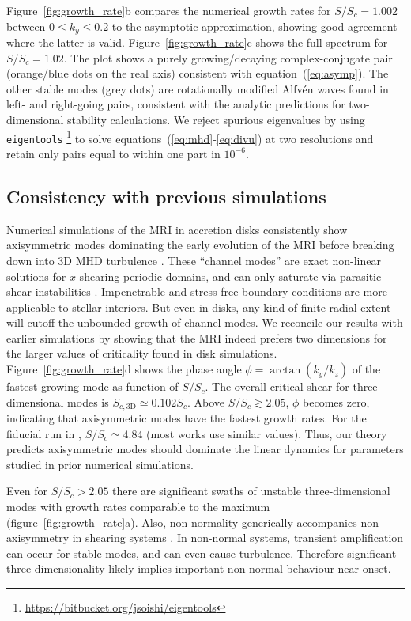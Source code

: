 \documentclass[openacc]{rsproca_new}%
\newcommand{\SSC}{S/S_{c}}
\begin{document}
Figure~\ref{fig:growth_rate}b compares the numerical growth rates for $\SSC=1.002$ between $0\le{k_{y}}\le0.2$ to the asymptotic approximation, showing good agreement where the latter is valid.
Figure~\ref{fig:growth_rate}c shows the full spectrum for $\SSC=1.02$.
The plot shows a purely growing/decaying complex-conjugate pair (orange/blue dots on the real axis) consistent with equation~(\ref{eq:asymp}).
The other stable modes (grey dots) are rotationally modified Alfv\'{e}n waves found in left- and right-going pairs, consistent with the analytic predictions for two-dimensional stability calculations.
We reject spurious eigenvalues by using \texttt{eigentools} \footnote{\protect\url{https://bitbucket.org/jsoishi/eigentools}} to solve equations~(\ref{eq:mhd}-\ref{eq:divu}) at two resolutions and retain only pairs equal to within one part in $10^{-6}$.

\subsection{Consistency with previous simulations}
\label{sec:prior_work}


Numerical simulations of the MRI in accretion disks consistently show axisymmetric modes dominating the early evolution of the MRI before breaking down into 3D MHD turbulence \cite{1995ApJ...440..742H,2018ApJ...853..174H,2019ApJS..241...26D}. 
These ``channel modes'' are exact non-linear solutions for $x$-shearing-periodic domains, and can only saturate via parasitic shear instabilities \cite{1994ApJ...432..213G}.
Impenetrable and stress-free boundary conditions are more applicable to stellar interiors. 
But even in disks, any kind of finite radial extent will cutoff the unbounded growth of channel modes. 
We reconcile our results with earlier simulations by showing that the MRI indeed prefers two dimensions for the larger values of criticality found in disk simulations. 
Figure~\ref{fig:growth_rate}d shows the phase angle $\phi=\arctan(k_{y}/k_{z})$ of the fastest growing mode as function of $\SSC$.
The overall critical shear for three-dimensional modes is $S_{c,\text{3D}}\simeq0.102S_c$.
Above $\SSC\gtrsim2.05$, $\phi$ becomes zero, indicating that axisymmetric modes have the fastest growth rates.
For the fiducial run in \cite{1996ApJ...464..690H}, $\SSC\simeq4.84$ (most works use similar values).
Thus, our theory predicts axisymmetric modes should dominate the linear dynamics for parameters studied in prior numerical simulations.

Even for $\SSC> 2.05$ there are significant swaths of unstable three-dimensional modes with growth rates comparable to the maximum (figure~\ref{fig:growth_rate}a).
Also, non-normality generically accompanies non-axisymmetry in shearing systems \cite{1992MNRAS.255P..25K}.
In non-normal systems, transient amplification can occur for stable modes, and can even cause turbulence.
Therefore significant three dimensionality likely implies important non-normal behaviour near onset.
\end{document}
